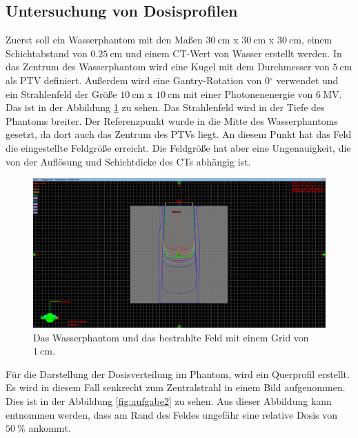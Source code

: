 \subsection{Untersuchung von Dosisprofilen}
\label{subsec:Dosisprofilen}

Zuerst soll ein Wasserphantom mit den Maßen $\SI{30}{\centi\meter}$ x $\SI{30}{\centi\meter}$ x $\SI{30}{\centi\meter}$, einem Schichtabstand von $\SI{0.25}{\centi\meter}$ und einem CT-Wert von Wasser erstellt werden. In das Zentrum des Wasserphantom wird eine Kugel mit dem Durchmesser von $\SI{5}{\centi\meter}$ als PTV definiert. Außerdem wird eine Gantry-Rotation von 0$^\circ$ verwendet und ein Strahlenfeld der Größe $\SI{10}{\centi\meter}$ x $\SI{10}{\centi\meter}$
mit einer Photonenenergie von $\SI{6}{\mega\volt}$. Das ist in der Abbildung \ref{fig:aufgabe21} zu sehen.
Das Strahlenfeld wird in der Tiefe des Phantoms breiter.
Der Referenzpunkt wurde in die Mitte des Wasserphantoms gesetzt, da dort auch das Zentrum des PTVs liegt. An diesem Punkt hat das Feld die eingestellte Feldgröße erreicht. Die Feldgröße hat aber eine Ungenauigkeit, die von der Auflösung und Schichtdicke des CTs abhängig ist.

\begin{figure}[H]
	\centering
	\includegraphics[width=0.9\linewidth]{../../Wasserphantom Bilder/Aufgabe2.1_2.png}
	\caption{Das Wasserphantom und das bestrahlte Feld mit einem Grid von $\SI{1}{\centi\meter}$.}
	\label{fig:aufgabe21}
\end{figure}

Für die Darstellung der Dosisverteilung im Phantom, wird ein Querprofil erstellt. Es wird in diesem Fall senkrecht zum Zentralstrahl in einem Bild aufgenommen. Dies ist in der Abbildung \ref{fig:aufgabe2} zu sehen. Aus dieser Abbildung kann entnommen werden, dass am Rand des Feldes ungefähr eine relative Dosis von $\SI{50}{\percent}$ ankommt.

